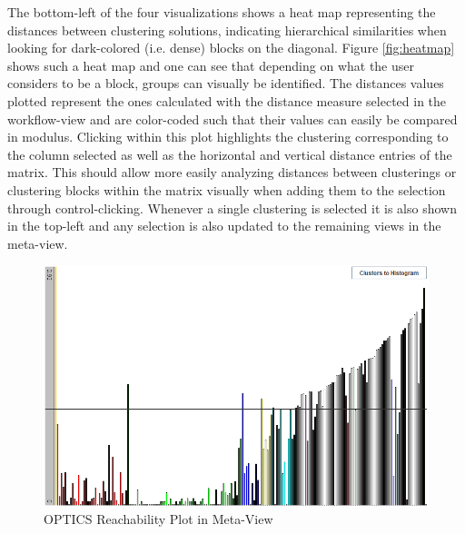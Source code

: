 \documentclass[
	a4paper,
	english,
	twoside,
	openright,               
	11pt                            
	]{report}
\begin{document}
The bottom-left of the four visualizations shows a heat map representing the distances between clustering solutions, indicating hierarchical similarities when looking for dark-colored (i.e. dense) blocks on the diagonal. Figure \ref{fig:heatmap} shows such a heat map and one can see that depending on what the user considers to be a block, groups can visually be identified. The distances values plotted represent the ones calculated with the distance measure selected in the workflow-view and are color-coded such that their values can easily be compared in modulus. Clicking within this plot highlights the clustering corresponding to the column selected as well as the horizontal and vertical distance entries of the matrix. This should allow more easily analyzing distances between clusterings or clustering blocks within the matrix visually when adding them to the selection through control-clicking. Whenever a single clustering is selected it is also shown in the top-left and any selection is also updated to the remaining views in the meta-view.

\begin{figure}[h]
	\centering
	\includegraphics[scale=.45]{reach-plot}
	\caption{OPTICS Reachability Plot in Meta-View }
	\label{fig:opticsplot}
\end{figure}
\end{document}
